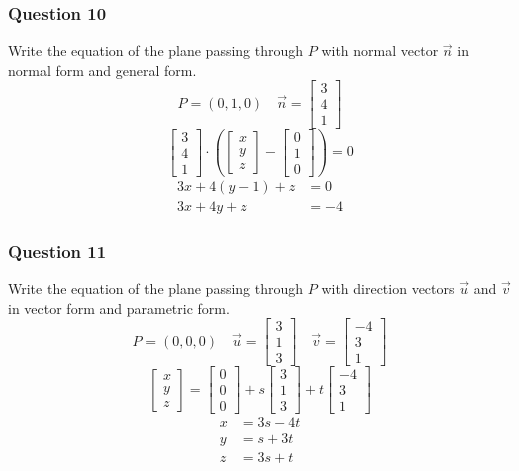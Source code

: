 \documentclass{math}
\begin{document}
\subsubsection*{Question 10}
Write the equation of the plane passing through \( P \) with normal vector
\( \vec{n} \) in normal form and general form.
\[ P = (0,1,0) \quad \vec{n} = \begin{bmatrix}3 \\ 4 \\ 1\end{bmatrix} \]
\[ \begin{bmatrix}3 \\ 4 \\ 1\end{bmatrix}\cdot\left(
  \begin{bmatrix}x \\ y \\ z\end{bmatrix}-
  \begin{bmatrix}0 \\ 1 \\ 0\end{bmatrix}
\right) = 0 \]
\begin{align*}
  3x+4(y-1)+z &= 0 \\
  3x+4y+z &= -4
\end{align*}

\subsubsection*{Question 11}
Write the equation of the plane passing through \( P \) with direction vectors
\( \vec{u} \) and \( \vec{v} \) in vector form and parametric form.
\[ P = (0,0,0) \quad \vec{u} = \begin{bmatrix}3 \\ 1 \\ 3\end{bmatrix} \quad
  \vec{v} = \begin{bmatrix}-4 \\ 3 \\ 1\end{bmatrix} \]
\[ \begin{bmatrix}x \\ y \\ z\end{bmatrix} =
  \begin{bmatrix}0 \\ 0 \\ 0\end{bmatrix}+
  s\begin{bmatrix}3 \\ 1 \\ 3\end{bmatrix}+
  t\begin{bmatrix}-4 \\ 3 \\ 1\end{bmatrix} \]
\begin{align*}
  x &= 3s-4t \\
  y &= s+3t \\
  z &= 3s+t
\end{align*}
\end{document}
